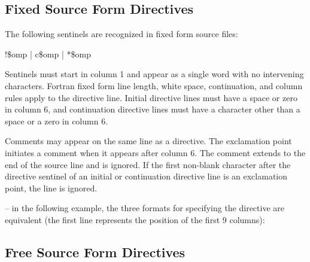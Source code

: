 \pagebreak
\vspace{2\baselineskip}
\fortranspecificstart
\vspace{-3\baselineskip}
\subsection{Fixed Source Form Directives}
\label{subsec:Fixed Source Form Directives}
The following sentinels are recognized in fixed form source files:

\begin{boxedcode}
!\$omp \textnormal{|} c\$omp \textnormal{|} *\$omp
\end{boxedcode}

Sentinels must start in column 1 and appear as a single word with no intervening 
characters. Fortran fixed form line length, white space, continuation, and column rules 
apply to the directive line. Initial directive lines must have a space or zero in column 6, 
and continuation directive lines must have a character other than a space or a zero in 
column 6.

Comments may appear on the same line as a directive. The exclamation point initiates a 
comment when it appears after column 6. The comment extends to the end of the source 
line and is ignored. If the first non-blank character after the directive sentinel of an 
initial or continuation directive line is an exclamation point, the line is ignored.

\notestart
\noteheader – in the following example, the three formats for specifying the directive are 
equivalent (the first line represents the position of the first 9 columns):

\begin{alltt}
\end{alltt}
\noteend










\subsection{Free Source Form Directives}
\label{subsec:Free Source Form Directives}

